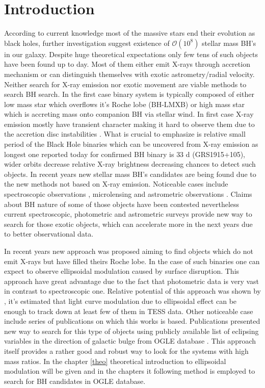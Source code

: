 \documentclass{pracalicmgr}
\begin{document}
\chapter{Introduction}
\hspace{1cm} According to current knowledge most of the massive stars end their evolution as black holes, further investigation suggest existence of $\mathcal{O}(10^8)$ 
stellar mass BH's \citep{brown_scenario_1994} in our galaxy. Despite huge theoretical expectations only few tens of such objects have been found up to day. Most of them either emit X-rays through
accretion mechanism or can distinguish themselves with exotic astrometry/radial velocity. Neither search for X-ray emission nor exotic movement are viable methods to search BH search.
In the first case binary system is typically composed of either low mass star which overflows it's Roche lobe
(BH-LMXB) or high mass star which is accreting mass onto companion BH via stellar wind. In first case X-ray emission mostly have transient character \citep{bambi_transient_2016}
making it hard to observe them due to the accretion disc instabilities \citep{lasota_disc_2001}. What is crucial to emphasize is relative small period of the Black Hole binaries 
which can be uncovered from X-ray emission as longest one reported today for confirmed BH binary is $33$ d (GRS1915+105), wider orbits decrease relative X-ray brightness decreasing
chances to detect such objects.
In recent years new stellar mass BH's candidates are being found due to the new methods not based on X-ray emission. Noticeable cases include spectroscopic observations 
\citep{liu_wide_2019,jayasinghe_unicorn_2021}, microlensing \citep{sahu_isolated_2022} and astrometric observations \citep{el-badry_sun-like_2022}. Claims about BH nature of 
some of those objects have been contested nevertheless current spectroscopic, photometric and astrometric surveys provide new way to search for those exotic objects, which can
accelerate more in the next years due to better observational data.

In recent years new approach was proposed aiming to find objects which do not emit X-rays but have filled theirs Roche lobe. In the case of such binaries one can expect to
observe ellipsoidal modulation caused by surface disruption. This approach have great advantage due to the fact that photometric data is very vast in contrast to spectroscopic one.
Relative potential of this approach was shown by \citep{masuda_prospects_2019}, it's estimated that light curve modulation due to ellipsoidal effect can be enough to track down
at least few of them in TESS data. Other noticeable case include series of publications \citep{gomel_search_2021,gomel_search_2021-1,gomel_search_2021-2} on which this works is based.
Publications presented new way to search for this type of objects using publicly available list of eclipsing variables in the direction of galactic bulge from OGLE database
 \citep{soszynski_ogle_2016}. This approach itself provides a rather good and robust way to look for the systems with high mass ratios. In the chapter \ref{theo} theoretical
introduction to ellipsoidal modulation will be given and in the chapters it following method is employed to search for BH candidates in OGLE database.
\end{document}
